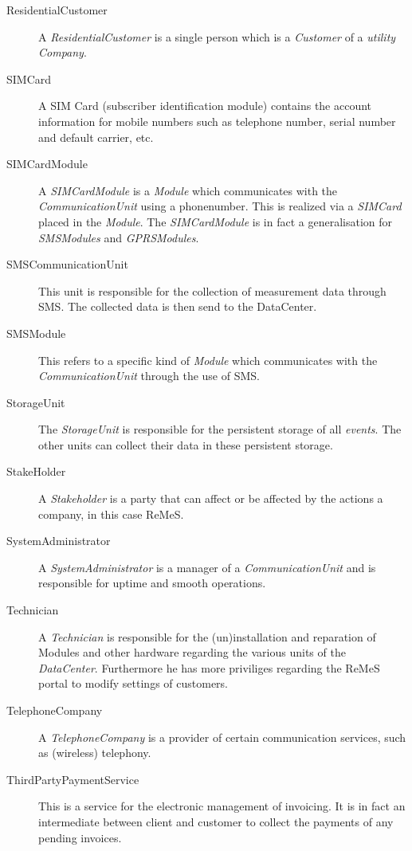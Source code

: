\begin{description}
\item[ResidentialCustomer] A \emph{ResidentialCustomer} is a single person which
is a \emph{Customer} of a \emph{utility} \emph{Company}. 

\item[SIMCard] A SIM Card (subscriber identification module) contains the
account information for mobile numbers such as telephone number, serial number
and default carrier, etc.

\item[SIMCardModule] A \emph{SIMCardModule} is a \emph{Module} which
communicates with the \emph{CommunicationUnit} using a phonenumber. This is
realized via a \emph{SIMCard} placed in the \emph{Module}. The
\emph{SIMCardModule} is in fact a generalisation for \emph{SMSModules} and
\emph{GPRSModules}.

\item[SMSCommunicationUnit] This unit is responsible for the collection of
measurement data through SMS. The collected data is then send to the DataCenter.

\item[SMSModule] This refers to a specific kind of \emph{Module} which
communicates with the \emph{CommunicationUnit} through the use of SMS.

\item[StorageUnit] The \emph{StorageUnit} is responsible for the persistent
storage of all \emph{events}. The other units can collect their data in these
persistent storage.

\item[StakeHolder]A \emph{Stakeholder} is a party that can affect or be
affected by the actions a company, in this case ReMeS.

\item[SystemAdministrator] A \emph{SystemAdministrator} is a manager of a
\emph{CommunicationUnit} and is responsible for uptime and smooth operations.

\item[Technician] A \emph{Technician} is responsible for the (un)installation
and reparation of Modules and other hardware regarding the various units of the
\emph{DataCenter}. Furthermore he has more priviliges regarding the ReMeS portal
to modify settings of customers.

\item[TelephoneCompany] A \emph{TelephoneCompany} is a provider of certain
communication services, such as (wireless) telephony.

\item[ThirdPartyPaymentService] This is a service for the electronic management
of invoicing. It is in fact an intermediate between client and customer to
collect the payments of any pending invoices.


\end{description}
